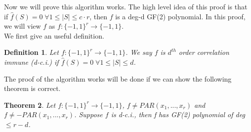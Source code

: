 \documentclass[12pt]{article}
\newtheorem{theorem}{Theorem}
\newtheorem{definition}[theorem]{Definition}
\begin{document}
Now we will prove this algorithm works. The high level idea of this
proof is that if $\hat {f}(S) = 0 \; \forall 1 \le |S| \le c \cdot r$,
then $f$ is a deg-d GF(2) polynomial. In this proof, we will view $f$
as $f: \{ -1, 1 \}^r \rightarrow \{ -1, 1 \}$. \\

We first give an useful definition.

\begin{definition}
Let $f: \{ -1, 1 \}^r \rightarrow \{ -1, 1 \}$. We say $f$ is $d^{th}$
order correlation immune (d-c.i.) if $\hat {f}(S) = 0 \; \forall 1 \le
|S| \le d$.
\end{definition}

The proof of the algorithm works will be done if we can show the
following theorem is correct.

\begin{theorem}
Let $f: \{ -1, 1 \}^r \rightarrow \{ -1, 1 \}$, $f \neq
PAR(x_1,...,x_r)$ and $f \neq -PAR(x_1,...,x_r)$. Suppose $f$ is
d-c.i., then f has GF(2) polynomial of deg $\le r - d$. 
\end{theorem}
\end{document}
